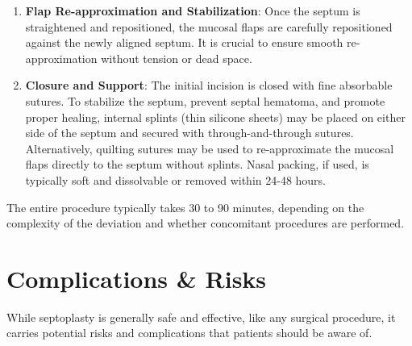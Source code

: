 \begin{enumerate}
  \item \textbf{Flap Re-approximation and Stabilization}: Once the septum is straightened and repositioned, the mucosal flaps are carefully repositioned against the newly aligned septum. It is crucial to ensure smooth re-approximation without tension or dead space.
  \item \textbf{Closure and Support}: The initial incision is closed with fine absorbable sutures. To stabilize the septum, prevent septal hematoma, and promote proper healing, internal splints (thin silicone sheets) may be placed on either side of the septum and secured with through-and-through sutures. Alternatively, quilting sutures may be used to re-approximate the mucosal flaps directly to the septum without splints. Nasal packing, if used, is typically soft and dissolvable or removed within 24-48 hours.
\end{enumerate}
The entire procedure typically takes 30 to 90 minutes, depending on the complexity of the deviation and whether concomitant procedures are performed.

\section*{Complications \& Risks}
While septoplasty is generally safe and effective, like any surgical procedure, it carries potential risks and complications that patients should be aware of.

